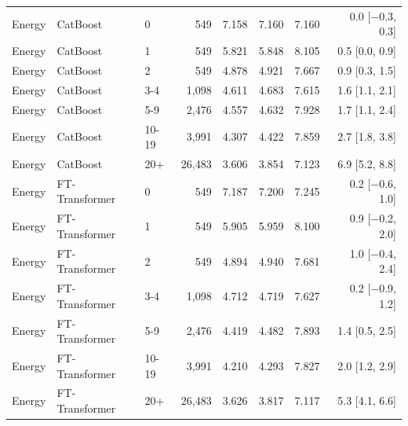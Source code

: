 {\begin{longtable}{lllrrrrr}
Energy & CatBoost & 0 & 549 & 7.158 & 7.160 & 7.160 & 0.0 [$-$0.3, 0.3] \\
Energy & CatBoost & 1 & 549 & 5.821 & 5.848 & 8.105 & 0.5 [0.0, 0.9] \\
Energy & CatBoost & 2 & 549 & 4.878 & 4.921 & 7.667 & 0.9 [0.3, 1.5] \\
Energy & CatBoost & 3-4 & 1,098 & 4.611 & 4.683 & 7.615 & 1.6 [1.1, 2.1] \\
Energy & CatBoost & 5-9 & 2,476 & 4.557 & 4.632 & 7.928 & 1.7 [1.1, 2.4] \\
Energy & CatBoost & 10-19 & 3,991 & 4.307 & 4.422 & 7.859 & 2.7 [1.8, 3.8] \\
Energy & CatBoost & 20+ & 26,483 & 3.606 & 3.854 & 7.123 & 6.9 [5.2, 8.8] \\
Energy & FT-Transformer & 0 & 549 & 7.187 & 7.200 & 7.245 & 0.2 [$-$0.6, 1.0] \\
Energy & FT-Transformer & 1 & 549 & 5.905 & 5.959 & 8.100 & 0.9 [$-$0.2, 2.0] \\
Energy & FT-Transformer & 2 & 549 & 4.894 & 4.940 & 7.681 & 1.0 [$-$0.4, 2.4] \\
Energy & FT-Transformer & 3-4 & 1,098 & 4.712 & 4.719 & 7.627 & 0.2 [$-$0.9, 1.2] \\
Energy & FT-Transformer & 5-9 & 2,476 & 4.419 & 4.482 & 7.893 & 1.4 [0.5, 2.5] \\
Energy & FT-Transformer & 10-19 & 3,991 & 4.210 & 4.293 & 7.827 & 2.0 [1.2, 2.9] \\
Energy & FT-Transformer & 20+ & 26,483 & 3.626 & 3.817 & 7.117 & 5.3 [4.1, 6.6] \\
\end{longtable}}

